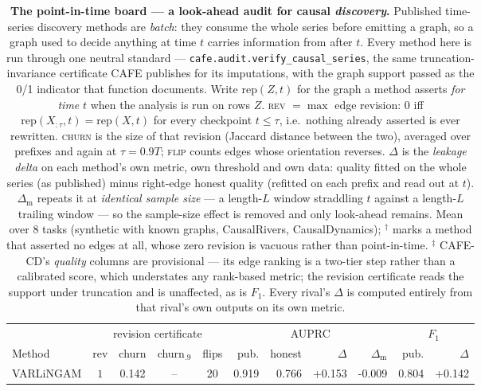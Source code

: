 \begin{table}[tbp]\centering\small
\setlength{\tabcolsep}{3.5pt}
\caption{\textbf{The point-in-time board --- a look-ahead audit for causal \emph{discovery}.} Published time-series discovery methods are \emph{batch}: they consume the whole series before emitting a graph, so a graph used to decide anything at time $t$ carries information from after $t$. Every method here is run through one neutral standard --- \texttt{cafe.audit.verify\_causal\_series}, the same truncation-invariance certificate CAFE publishes for its imputations, with the graph support passed as the 0/1 indicator that function documents. Write $\mathrm{rep}(Z,t)$ for the graph a method asserts \emph{for time} $t$ when the analysis is run on rows $Z$. \textsc{rev} $=\max$ edge revision: $0$ iff $\mathrm{rep}(X_{:\tau},t)=\mathrm{rep}(X,t)$ for every checkpoint $t\le\tau$, i.e.\ nothing already asserted is ever rewritten. \textsc{churn} is the size of that revision (Jaccard distance between the two), averaged over prefixes and again at $\tau=0.9T$; \textsc{flip} counts edges whose orientation reverses. $\Delta$ is the \emph{leakage delta} on each method's own metric, own threshold and own data: quality fitted on the whole series (as published) minus right-edge honest quality (refitted on each prefix and read out at $t$). $\Delta_{\mathrm{m}}$ repeats it at \emph{identical sample size} --- a length-$L$ window straddling $t$ against a length-$L$ trailing window --- so the sample-size effect is removed and only look-ahead remains. Mean over 8 tasks (synthetic with known graphs, CausalRivers, CausalDynamics); $^{\dagger}$ marks a method that asserted no edges at all, whose zero revision is vacuous rather than point-in-time. $^{\ddagger}$ CAFE-CD's \emph{quality} columns are provisional --- its edge ranking is a two-tier step rather than a calibrated score, which understates any rank-based metric; the revision certificate reads the support under truncation and is unaffected, as is $F_1$. Every rival's $\Delta$ is computed entirely from that rival's own outputs on its own metric.}
\label{tab:pitboard}
\begin{tabular}{@{}lccccrrrrrr@{}}
\toprule
 & \multicolumn{4}{c}{revision certificate} & \multicolumn{4}{c}{AUPRC} & \multicolumn{2}{c}{$F_1$} \\
\cmidrule(lr){2-5}\cmidrule(lr){6-9}\cmidrule(lr){10-11}
Method & rev & churn & churn$_{.9}$ & flips & pub. & honest & $\Delta$ & $\Delta_{\mathrm{m}}$ & pub. & $\Delta$ \\
\midrule
VARLiNGAM & $1$ & 0.142 & -- & 20 & 0.919 & 0.766 & +0.153 & -0.009 & 0.804 & +0.142 \\

\end{tabular}
\end{table}
